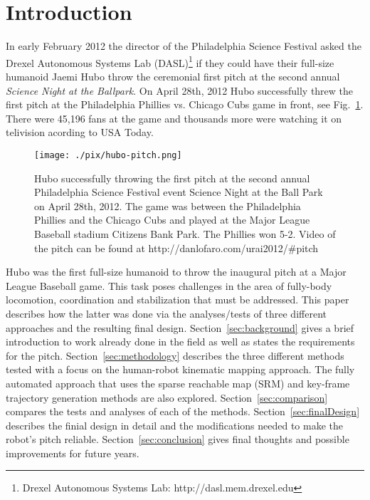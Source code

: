 \section{\bf Introduction}
In early February 2012 the director of the Philadelphia Science Festival asked the Drexel Autonomous Systems Lab (DASL)\footnote{Drexel Autonomous Systems Lab: http://dasl.mem.drexel.edu}\label{foot:dasl} if they could have their full-size humanoid Jaemi Hubo throw the ceremonial first pitch at the second annual \textit{Science Night at the Ballpark}.  
On April 28th, 2012 Hubo successfully threw the first pitch at the Philadelphia Phillies vs. Chicago Cubs game in front, see Fig.~\ref{fig:hubo-throw}.
There were 45,196 fans at the game and thousands more were watching it on telivision acording to USA Today.

\begin{figure}[t]
  \centering
\texttt{[image: ./pix/hubo-pitch.png]}
  \caption{Hubo successfully throwing the first pitch at the second annual Philadelphia Science Festival event Science Night at the Ball Park on April 28th, 2012.  The game was between the Philadelphia Phillies and the Chicago Cubs and played at the Major League Baseball stadium Citizens Bank Park.  The Phillies won 5-2.  Video of the pitch can be found at http://danlofaro.com/urai2012/\#pitch}
  \label{fig:hubo-throw}
\end{figure}



Hubo was the first full-size humanoid to throw the inaugural pitch at a Major League Baseball game.  
This task poses challenges in the area of fully-body locomotion, coordination and stabilization that must be addressed.
This paper describes how the latter was done via the analyses/tests of three different approaches and the resulting final design.
Section~\ref{sec:background} gives a brief introduction to work already done in the field as well as states the requirements for the pitch.
Section~\ref{sec:methodology} describes the three different methods tested with a focus on the human-robot kinematic mapping approach.  
The fully automated approach that uses the sparse reachable map (SRM)\cite{dlofaro-srm} and key-frame trajectory generation methods are also explored.
Section~\ref{sec:comparison} compares the tests and analyses of each of the methods.
Section~\ref{sec:finalDesign} describes the finial design in detail and the modifications needed to make the robot's pitch reliable.
Section~\ref{sec:conclusion} gives final thoughts and possible improvements for future years.


